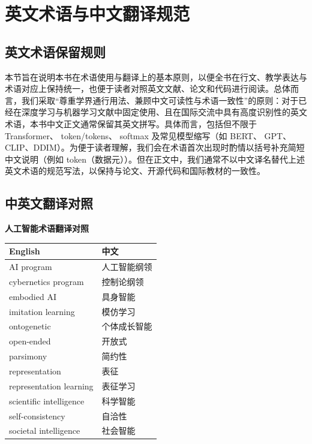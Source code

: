 \chapter*{英文术语与中文翻译规范}

\section*{英文术语保留规则}

本节旨在说明本书在术语使用与翻译上的基本原则，以便全书在行文、教学表达与术语对应上保持统一，也便于读者对照英文文献、论文和代码进行阅读。总体而言，我们采取“尊重学界通行用法、兼顾中文可读性与术语一致性”的原则：对于已经在深度学习与机器学习文献中固定使用、且在国际交流中具有高度识别性的英文术语，本书中文正文通常保留其英文拼写。具体而言，包括但不限于 Transformer、 token/tokens、 softmax 及常见模型缩写（如 BERT、 GPT、 CLIP、DDIM）。为便于读者理解，我们会在术语首次出现时酌情以括号补充简短中文说明（例如 token（数据元））。但在正文中，我们通常不以中文译名替代上述英文术语的规范写法，以保持与论文、开源代码和国际教材的一致性。


\section*{中英文翻译对照}

\begin{center}
\textbf{人工智能术语翻译对照}

\vspace{0.3em}

\begin{tabular}{ll}
\hline
\textbf{English} & \textbf{中文} \\
\hline
AI program & 人工智能纲领 \\
cybernetics program & 控制论纲领 \\
embodied AI & 具身智能 \\
imitation learning & 模仿学习 \\
ontogenetic & 个体成长智能 \\
open-ended & 开放式 \\
parsimony & 简约性 \\
representation & 表征 \\
representation learning & 表征学习 \\
scientific intelligence & 科学智能 \\
self-consistency & 自洽性 \\
societal intelligence & 社会智能 \\
\hline
\end{tabular}
\end{center}



